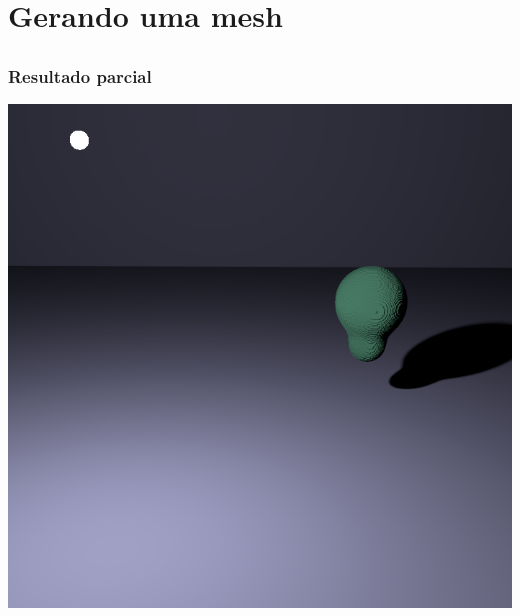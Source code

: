 \documentclass[brazil]{beamer}
\begin{document}
  \section{Gerando uma mesh}
  
    \subsection{}
    
      \begin{frame}
        \frametitle{Resultado parcial}
        \begin{center}
          \includegraphics[width=.6\textwidth]{imgs/metaball-preview.png}
        \end{center}
      \end{frame}
  
\end{document}

